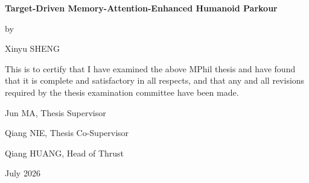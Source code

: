 \documentclass[12pt,oneside,openany]{book}
\newcommand{\ThesisTitleText}{Target-Driven Memory-Attention-Enhanced Humanoid Parkour}
\newcommand{\ThesisAuthorText}{Xinyu SHENG}
\newcommand{\SupervisorName}{Jun MA}
\newcommand{\CoSupervisorName}{Qiang NIE}
\newcommand{\ThrustHeadName}{Qiang HUANG}
\begin{document}
\clearpage
\thispagestyle{plain}
\vspace*{25mm}
\begin{center}
{\Large\bfseries \ThesisTitleText\par}
\vspace{1em}
by\par
\vspace{1\baselineskip}
{\Large \ThesisAuthorText\par}
\end{center}
\vspace{2em}
This is to certify that I have examined the above MPhil thesis and have found that it is complete and satisfactory in all respects, and that any and all revisions required by the thesis examination committee have been made.\par
\vspace{3em}
\noindent \SupervisorName, Thesis Supervisor\par
\vspace{1.5em}
\noindent \CoSupervisorName, Thesis Co-Supervisor\par
\vspace{1.5em}
\noindent \ThrustHeadName, Head of Thrust\par
\vfill
{} July 2026\par

\tableofcontents
\listoffigures
\listoftables

\mainmatter










\backmatter

\end{document}
